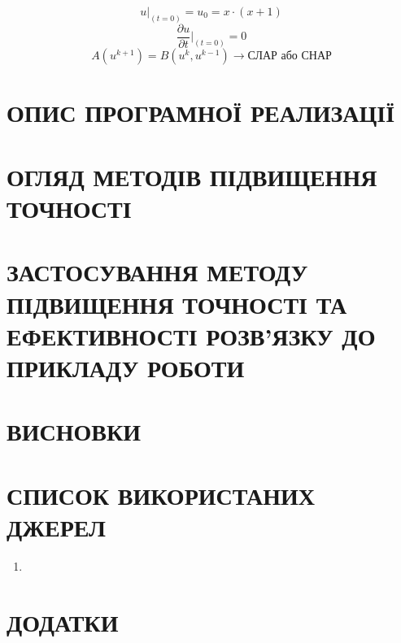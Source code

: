 \documentclass{article}
\begin{document}
        $$ u \vert_{(t = 0)} = u_0 = x \cdot (x+1) $$
        $$ \frac{\partial{u}}{\partial{t}} \vert_{(t = 0)} = 0 $$
        $$ A\left(u^{k+1}\right) = B\left(u^k, u^{k-1}\right) \rightarrow \text{СЛАР або СНАР} $$

    \newpage
    \section{ОПИС ПРОГРАМНОЇ РЕАЛИЗАЦІЇ}
    \newpage
    \section{ОГЛЯД МЕТОДІВ ПІДВИЩЕННЯ ТОЧНОСТІ}
    \newpage
    \section{ЗАСТОСУВАННЯ МЕТОДУ ПІДВИЩЕННЯ ТОЧНОСТІ ТА ЕФЕКТИВНОСТІ РОЗВ’ЯЗКУ ДО ПРИКЛАДУ РОБОТИ}
    \newpage
    \section{ВИСНОВКИ}
    \newpage
    \section{СПИСОК ВИКОРИСТАНИХ ДЖЕРЕЛ}
    \begin{enumerate}
        \item 
    \end{enumerate}
    \newpage
    \section{ДОДАТКИ}
\end{document}
